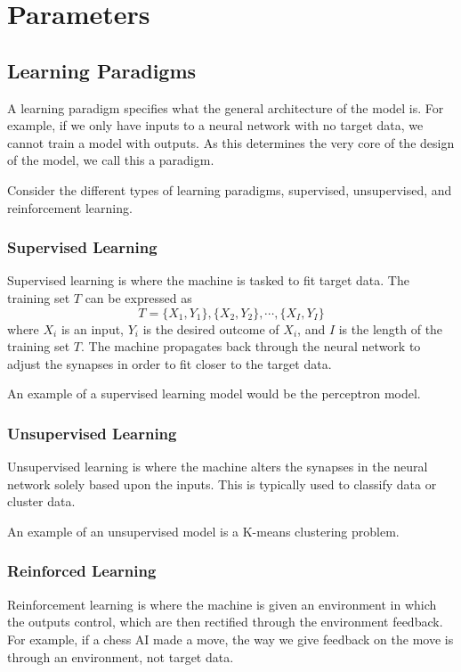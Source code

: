\section{Parameters}
\label{params}

\subsection{Learning Paradigms}
\label{paradigms}

A learning paradigm specifies what the general architecture of the \gls{model} is. For example, if we only have inputs to a neural network with no target data, we cannot train a \gls{model} with outputs. As this determines the very core of the design of the \gls{model}, we call this a paradigm.

Consider the different types of learning paradigms, supervised, unsupervised, and reinforcement learning.

\subsubsection{Supervised Learning}

Supervised learning is where the machine is tasked to fit target data. The training set $T$ can be expressed as $$T=\{X_1, Y_1\},\{X_2, Y_2\},\cdots,\{X_I, Y_I\}$$ where $X_i$ is an input, $Y_i$ is the desired outcome of $X_i$, and $I$ is the length of the training set $T$. The machine propagates back through the neural network to adjust the \gls{synapse}s in order to fit closer to the target data.

An example of a supervised learning \gls{model} would be the \gls{perceptron} \gls{model}.

\subsubsection{Unsupervised Learning}

Unsupervised learning is where the machine alters the \gls{synapse}s in the neural network solely based upon the inputs. This is typically used to classify data or cluster data.

An example of an unsupervised \gls{model} is a K-means clustering problem.

\subsubsection{Reinforced Learning}

Reinforcement learning is where the machine is given an environment in which the outputs control, which are then rectified through the environment feedback. For example, if a chess AI made a move, the way we give feedback on the move is through an environment, not target data. 

